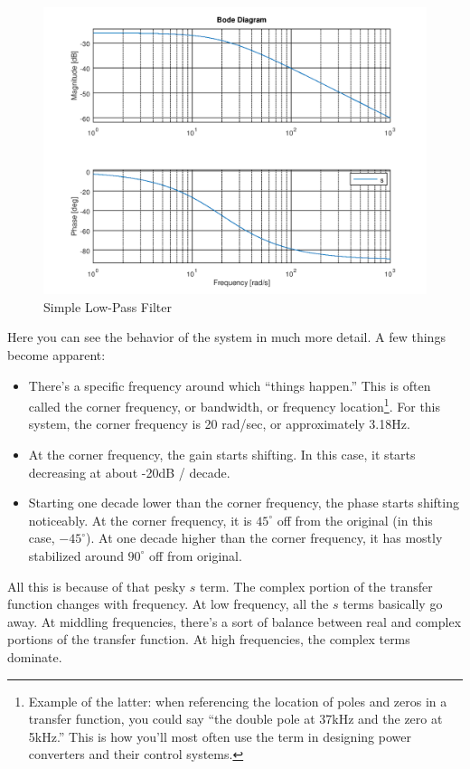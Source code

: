 \begin{figure}[h]
\centering
\includegraphics[scale=0.5]{simple_LPF.png}
\caption{Simple Low-Pass Filter}\label{simple_LPF_bode}
\end{figure}

Here you can see the behavior of the system in much more detail. A few things become apparent:

\begin{itemize}

\item There's a specific frequency around which ``things happen.'' This is often called the corner frequency, or bandwidth, or frequency location\footnote{Example of the latter: when referencing the location of poles and zeros in a transfer function, you could say ``the double pole at 37kHz and the zero at 5kHz.'' This is how you'll most often use the term in designing power converters and their control systems.}. For this system, the corner frequency is 20 rad/sec, or approximately 3.18Hz.
\item At the corner frequency, the gain starts shifting. In this case, it starts decreasing at about -20dB / decade.
\item Starting one decade lower than the corner frequency, the phase starts shifting noticeably. At the corner frequency, it is $45^{\circ}$ off from the original (in this case, $-45^{\circ}$). At one decade higher than the corner frequency, it has mostly stabilized around $90^{\circ}$ off from original.

\end{itemize}

All this is because of that pesky $s$ term. The complex portion of the transfer function changes with frequency. At low frequency, all the $s$ terms basically go away. At middling frequencies, there's a sort of balance between real and complex portions of the transfer function. At high frequencies, the complex terms dominate.